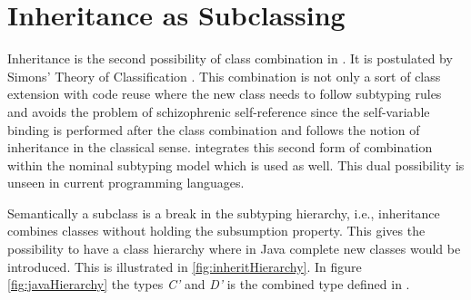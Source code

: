 
%
%
%
%

\section{Inheritance as Subclassing}
Inheritance is the second possibility of class combination in \ooplss. It
is postulated by Simons' Theory of Classification \cite{simons_theory_2004-2}.
This combination is not only a sort of class extension with code reuse where
the new class needs to follow subtyping rules and avoids the problem of
schizophrenic self-reference since the self-variable binding is performed after
the class combination and follows the notion of inheritance in the
classical sense. \ooplss integrates this second form of combination within
the nominal subtyping model which is used as well. This dual possibility is
unseen in current programming languages.

Semantically a subclass is a break in the subtyping hierarchy, i.e., inheritance
combines classes without holding the subsumption property. This gives \ooplss
the possibility to have a class hierarchy where in Java complete new classes
would be introduced. This is illustrated in \cref{fig:inheritHierarchy}. In figure
\ref{fig:javaHierarchy} the types \emph{C'} and \emph{D'} is the combined type
defined in \ooplss.

